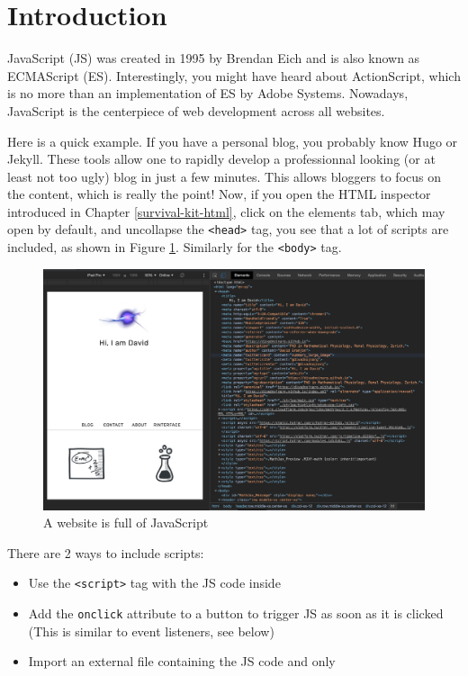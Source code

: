 \documentclass[
]{book}
\providecommand{\tightlist}{%
  \setlength{\itemsep}{0pt}\setlength{\parskip}{0pt}}
\begin{document}
\hypertarget{introduction}{%
\section{Introduction}\label{introduction}}

JavaScript (JS) was created in 1995 by Brendan Eich and is also known as ECMAScript (ES). Interestingly, you might have heard about ActionScript, which is no more than an implementation of ES by Adobe Systems. Nowadays, JavaScript is the centerpiece of web development across all websites.

Here is a quick example. If you have a personal blog, you probably know Hugo or Jekyll. These tools allow one to rapidly develop a professionnal looking (or at least not too ugly) blog in just a few minutes. This allows bloggers to focus on the content, which is really the point! Now, if you open the HTML inspector introduced in Chapter \ref{survival-kit-html}, click on the elements tab, which may open by default, and uncollapse the \texttt{\textless{}head\textgreater{}} tag, you see that a lot of scripts are included, as shown in Figure \ref{fig:scripts-list}. Similarly for the \texttt{\textless{}body\textgreater{}} tag.

\begin{figure}
\includegraphics[width=34.86in]{images/survival-kit/scripts-list} \caption{A website is full of JavaScript}\label{fig:scripts-list}
\end{figure}

There are 2 ways to include scripts:

\begin{itemize}
\tightlist
\item
  Use the \texttt{\textless{}script\textgreater{}} tag with the JS code inside
\item
  Add the \texttt{onclick} attribute to a button to trigger JS as soon as it is clicked (This is similar to event listeners, see below)
\item
  Import an external file containing the JS code and only
\end{itemize}
\end{document}
